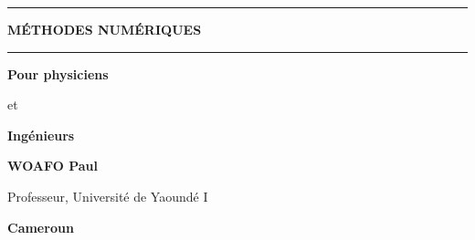 \documentclass[11pt,a4paper,oneside]{report}
\numberwithin{equation}{chapter}
\begin{document}
\hypersetup{pageanchor=false}
\begin{titlepage}
  \centering
  \vspace*{2cm}
  {\rule{\linewidth}{1.5pt}\par}
  \vspace{0.8cm}
  {\fontsize{34}{40}\selectfont\bfseries MÉTHODES NUMÉRIQUES\par}
  \vspace{0.8cm}
  {\rule{\linewidth}{1.5pt}\par}
  \vspace{1.5cm}
  {\LARGE\bfseries Pour physiciens\par}
  \vspace{0.3cm}
  {\Large et\par}
  \vspace{0.3cm}
  {\LARGE\bfseries Ingénieurs\par}
  \vfill
  {\Large\bfseries WOAFO Paul\par}
  \vspace{0.3cm}
  {\large Professeur, Université de Yaoundé I\par}
  \vspace{1.2cm}
  {\Large\bfseries Cameroun\par}
  \vspace{2cm}
\end{titlepage}
\hypersetup{pageanchor=true}



\tableofcontents
\clearpage
{}








\end{document}
